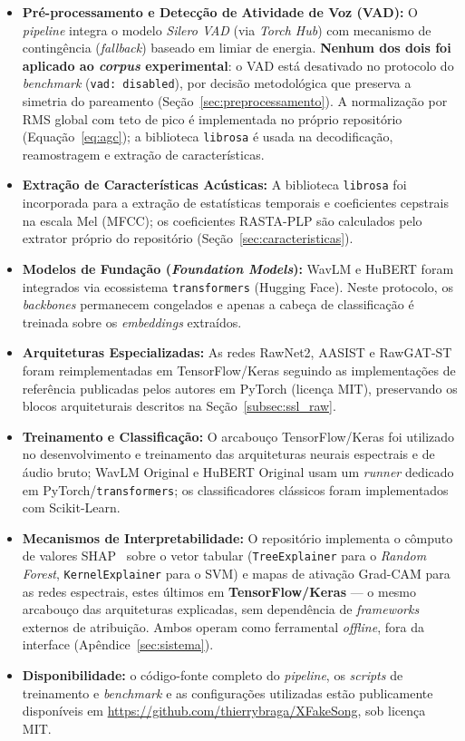 \documentclass[12pt,a4paper]{article}
\begin{document}
\begin{itemize}
	\item \textbf{Pré-processamento e Detecção de Atividade de Voz (VAD):} O \textit{pipeline} integra o modelo \textit{Silero VAD} (via \textit{Torch Hub}) com mecanismo de contingência (\textit{fallback}) baseado em limiar de energia. \textbf{Nenhum dos dois foi aplicado ao \textit{corpus} experimental}: o VAD está desativado no protocolo do \textit{benchmark} (\texttt{vad: disabled}), por decisão metodológica que preserva a simetria do pareamento (Seção~\ref{sec:preprocessamento}). A normalização por RMS global com teto de pico é implementada no próprio repositório (Equação~\ref{eq:agc}); a biblioteca \texttt{librosa} é usada na decodificação, reamostragem e extração de características.
	\item \textbf{Extração de Características Acústicas:} A biblioteca \texttt{librosa} foi incorporada para a extração de estatísticas temporais e coeficientes cepstrais na escala Mel (MFCC); os coeficientes RASTA-PLP são calculados pelo extrator próprio do repositório (Seção~\ref{sec:caracteristicas}).
	\item \textbf{Modelos de Fundação (\textit{Foundation Models}):} WavLM e HuBERT foram integrados via ecossistema \texttt{transformers} (Hugging Face). Neste protocolo, os \textit{backbones} permanecem congelados e apenas a cabeça de classificação é treinada sobre os \textit{embeddings} extraídos.
	\item \textbf{Arquiteturas Especializadas:} As redes RawNet2, AASIST e RawGAT-ST foram reimplementadas em TensorFlow/Keras seguindo as implementações de referência publicadas pelos autores em PyTorch (licença MIT), preservando os blocos arquiteturais descritos na Seção~\ref{subsec:ssl_raw}.
	\item \textbf{Treinamento e Classificação:} O arcabouço TensorFlow/Keras foi utilizado no desenvolvimento e treinamento das arquiteturas neurais espectrais e de áudio bruto; WavLM Original e HuBERT Original usam um \textit{runner} dedicado em PyTorch/\texttt{transformers}; os classificadores clássicos foram implementados com Scikit-Learn.
	\item \textbf{Mecanismos de Interpretabilidade:} O repositório implementa o cômputo de valores SHAP~\cite{lundberg2017unified} sobre o vetor tabular (\texttt{TreeExplainer} para o \textit{Random Forest}, \texttt{KernelExplainer} para o SVM) e mapas de ativação Grad-CAM para as redes espectrais, estes últimos em \textbf{TensorFlow/Keras} --- o mesmo arcabouço das arquiteturas explicadas, sem dependência de \textit{frameworks} externos de atribuição. Ambos operam como ferramental \emph{offline}, fora da interface (Apêndice~\ref{sec:sistema}).
	\item \textbf{Disponibilidade:} o código-fonte completo do \textit{pipeline}, os \textit{scripts} de treinamento e \textit{benchmark} e as configurações utilizadas estão publicamente disponíveis em \url{https://github.com/thierrybraga/XFakeSong}, sob licença MIT.
\end{itemize}
\end{document}
